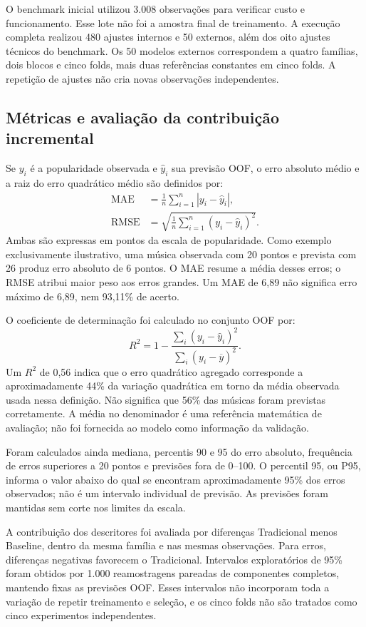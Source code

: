 O benchmark inicial utilizou 3.008 observações para verificar custo e funcionamento. Esse lote não foi a amostra final de treinamento. A execução completa realizou 480 ajustes internos e 50 externos, além dos oito ajustes técnicos do benchmark. Os 50 modelos externos correspondem a quatro famílias, dois blocos e cinco folds, mais duas referências constantes em cinco folds. A repetição de ajustes não cria novas observações independentes.

\subsection{Métricas e avaliação da contribuição incremental}

Se $y_i$ é a popularidade observada e $\widehat{y}_i$ sua previsão OOF, o erro absoluto médio e a raiz do erro quadrático médio são definidos por:
\begin{align}
\operatorname{MAE}&=\frac{1}{n}\sum_{i=1}^{n}|y_i-\widehat{y}_i|,\\
\operatorname{RMSE}&=\sqrt{\frac{1}{n}\sum_{i=1}^{n}(y_i-\widehat{y}_i)^2}.
\end{align}
Ambas são expressas em pontos da escala de popularidade. Como exemplo exclusivamente ilustrativo, uma música observada com 20 pontos e prevista com 26 produz erro absoluto de 6 pontos. O MAE resume a média desses erros; o RMSE atribui maior peso aos erros grandes. Um MAE de 6,89 não significa erro máximo de 6,89, nem 93,11\% de acerto.

O coeficiente de determinação foi calculado no conjunto OOF por:
\begin{equation}
R^2=1-\frac{\sum_i(y_i-\widehat{y}_i)^2}{\sum_i(y_i-\overline{y})^2}.
\end{equation}
Um $R^2$ de 0,56 indica que o erro quadrático agregado corresponde a aproximadamente 44\% da variação quadrática em torno da média observada usada nessa definição. Não significa que 56\% das músicas foram previstas corretamente. A média no denominador é uma referência matemática de avaliação; não foi fornecida ao modelo como informação da validação.

Foram calculados ainda mediana, percentis 90 e 95 do erro absoluto, frequência de erros superiores a 20 pontos e previsões fora de 0--100. O percentil 95, ou P95, informa o valor abaixo do qual se encontram aproximadamente 95\% dos erros observados; não é um intervalo individual de previsão. As previsões foram mantidas sem corte nos limites da escala.

A contribuição dos descritores foi avaliada por diferenças Tradicional menos Baseline, dentro da mesma família e nas mesmas observações. Para erros, diferenças negativas favorecem o Tradicional. Intervalos exploratórios de 95\% foram obtidos por 1.000 reamostragens pareadas de componentes completos, mantendo fixas as previsões OOF. Esses intervalos não incorporam toda a variação de repetir treinamento e seleção, e os cinco folds não são tratados como cinco experimentos independentes.
